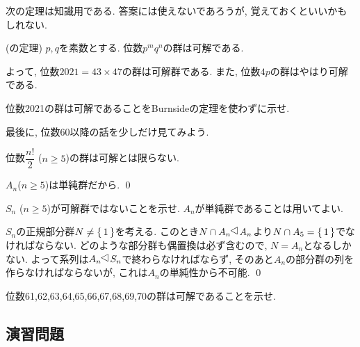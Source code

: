 次の定理は知識用である. 答案には使えないであろうが, 覚えておくといいかもしれない.
\begin{theo} (の定理)
$p,q$を素数とする. 位数$p^m q^n$の群は可解である.
\end{theo}
よって, 位数$2021 = 43\times 47$の群は可解群である. また, 位数$4p$の群はやはり可解である.
\begin{prac}
位数2021の群は可解であることをBurnsideの定理を使わずに示せ.
\end{prac}

最後に, 位数60以降の話を少しだけ見てみよう.
\begin{prop}
位数$\dfrac{n!}{2}$ ($n\geq 5$)の群は可解とは限らない.
\end{prop}
\prf $A_n$($n\geq 5$)は単純群だから. \qed

\begin{egprob}
$S_{n}$ ($n\geq 5$)が可解群ではないことを示せ. $A_n$が単純群であることは用いてよい.
\end{egprob}
\begin{egans} $S_n$の正規部分群$N\neq \set{1}$を考える. このとき$N\cap A_n\norgr A_n$より$N\cap A_5 = \set{1}$でなければならない. どのような部分群も偶置換は必ず含むので, $N=A_n$となるしかない. よって系列は$A_n\norgr S_n$で終わらなければならず, そのあと$A_n$の部分群の列を作らなければならないが, これは$A_n$の単純性から不可能. \qed
\end{egans}


\begin{prac}
位数61,62,63,64,65,66,67,68,69,70の群は可解であることを示せ.
\end{prac}





\subsection{演習問題}





\clearpage
